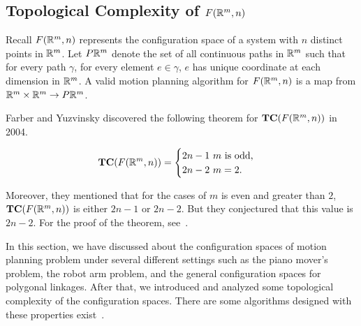 \subsection{Topological Complexity of \(F(\mathbb{R}^m,n)\)}
Recall \(F(\mathbb{R}^m,n)\) represents the configuration space of a system with \(n\) distinct points in \(\mathbb{R}^m\).
Let \(P\mathbb{R}^m\) denote the set of all continuous paths in \(\mathbb{R}^m\) such that for every path \(\gamma\), for every element \(e\in \gamma\), \(e\) has unique coordinate at each dimension in \(\mathbb{R}^m\).
A valid motion planning algorithm for \(F(\mathbb{R}^m,n)\) is a map from \(\mathbb{R}^m\times \mathbb{R}^m\to P\mathbb{R}^m\).

Farber and Yuzvinsky discovered the following theorem for \(\mathbf{TC}(F(\mathbb{R}^m,n))\) in 2004.
\begin{theorem}
  \[\mathbf{TC}(F(\mathbb{R}^m,n))=\begin{cases}
      2n-1 \text{ \(m\) is odd,}\\
      2n-2 \text{ \(m=2\)}.
    \end{cases}\]
\end{theorem}
Moreover, they mentioned that for the cases of \(m\) is even and greater than \(2\), \(\mathbf{TC}(F(\mathbb{R}^m,n))\) is either \(2n-1\) or \(2n-2\). But they conjectured that this value is \(2n-2\). For the proof of the theorem, see~\cite{farber2004topological}.

In this section, we have discussed about the configuration spaces of motion planning problem under several different settings such as the piano mover's problem, the robot arm problem, and the general configuration spaces for polygonal linkages. After that, we introduced and analyzed some topological complexity of the configuration spaces. There are some algorithms designed with these properties exist~\cite{farber2006topology}.